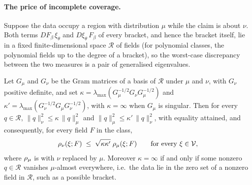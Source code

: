 \paragraph{The price of incomplete coverage.} Suppose the data occupy a region
with distribution $\mu$ while the claim is about $\nu$. Both terms
$DF_\beta\,\xi_\theta$ and $D\xi_\theta\,F_\beta$ of every bracket, and hence
the bracket itself, lie in a fixed finite-dimensional space $\mathcal R$ of
fields (for polynomial classes, the polynomial fields up to the degree of a
bracket), so the worst-case discrepancy between the two measures is a pair of
generalised eigenvalues.

\begin{proposition}
\label{prop:kappa}
Let $G_\mu$ and $G_\nu$ be the Gram matrices of a basis of $\mathcal R$ under
$\mu$ and $\nu$, with $G_\nu$ positive definite, and set
$\kappa = \lambda_{\max}(G_\mu^{-1/2} G_\nu G_\mu^{-1/2})$ and
$\kappa' = \lambda_{\max}(G_\nu^{-1/2} G_\mu G_\nu^{-1/2})$, with $\kappa =
\infty$ when $G_\mu$ is singular. Then for every $q \in \mathcal R$,
$\|q\|^2_{\nu} \le \kappa\,\|q\|^2_{\mu}$ and
$\|q\|^2_{\mu} \le \kappa'\,\|q\|^2_{\nu}$, with equality attained, and
consequently, for every field $F$ in the class,
\begin{equation}
  \rho_\nu(\xi;F) \;\le\; \sqrt{\kappa\kappa'}\;\rho_\mu(\xi;F)
  \qquad\text{for every } \xi \in \mathcal V ,
\end{equation}
where $\rho_\mu$ is  with $\nu$ replaced by $\mu$.
Moreover $\kappa = \infty$ if and only if some nonzero $q \in \mathcal R$
vanishes $\mu$-almost everywhere, i.e.\ the data lie in the zero set of a
nonzero field in $\mathcal R$, such as a possible bracket.
\end{proposition}

